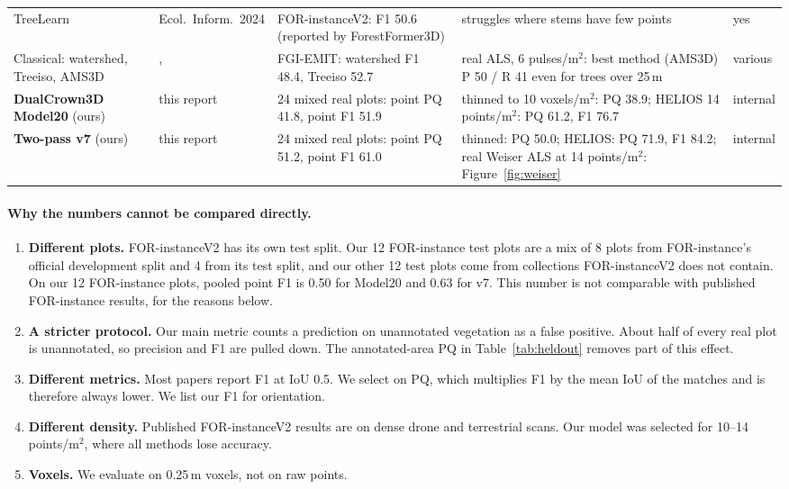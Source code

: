 \documentclass[11pt,a4paper]{article}
\newcommand{\ppsm}{points/m$^2$}
\newcommand{\vpsm}{voxels/m$^2$}
\begin{document}
\begin{table}[p]
\begin{tabularx}{\textwidth}{>{\raggedright\arraybackslash}p{2.9cm}>{\raggedright\arraybackslash}p{1.9cm}LL>{\raggedright\arraybackslash}p{1.8cm}}
TreeLearn \citep{henrich2024treelearn} & Ecol.\ Inform.\ 2024 & FOR-instanceV2: F1 50.6 (reported by ForestFormer3D) & struggles where stems have few points & yes \\
Classical: watershed, Treeiso, AMS3D & \citet{ruoppa2025fgiemit}, \citet{cao2023} & FGI-EMIT: watershed F1 48.4, Treeiso 52.7 & real ALS, 6 pulses/m$^2$: best method (AMS3D) P 50 / R 41 even for trees over 25\,m & various \\
\midrule
\textbf{DualCrown3D Model20} (ours) & this report & 24 mixed real plots: point PQ 41.8, point F1 51.9 & thinned to 10 \vpsm: PQ 38.9; HELIOS 14 \ppsm: PQ 61.2, F1 76.7 & internal \\
\textbf{Two-pass v7} (ours) & this report & 24 mixed real plots: point PQ 51.2, point F1 61.0 & thinned: PQ 50.0; HELIOS: PQ 71.9, F1 84.2; real Weiser ALS at 14 \ppsm: Figure~\ref{fig:weiser} & internal \\
\bottomrule
\end{tabularx}
\end{table}

\paragraph{Why the numbers cannot be compared directly.}
\begin{enumerate}
  \item \textbf{Different plots.} FOR-instanceV2 has its own test split. Our 12 FOR-instance test plots are a mix of 8 plots from FOR-instance's official development split and 4 from its test split, and our other 12 test plots come from collections FOR-instanceV2 does not contain. On our 12 FOR-instance plots, pooled point F1 is 0.50 for Model20 and 0.63 for v7. This number is not comparable with published FOR-instance results, for the reasons below.
  \item \textbf{A stricter protocol.} Our main metric counts a prediction on unannotated vegetation as a false positive. About half of every real plot is unannotated, so precision and F1 are pulled down. The annotated-area PQ in Table~\ref{tab:heldout} removes part of this effect.
  \item \textbf{Different metrics.} Most papers report F1 at IoU 0.5. We select on PQ, which multiplies F1 by the mean IoU of the matches and is therefore always lower. We list our F1 for orientation.
  \item \textbf{Different density.} Published FOR-instanceV2 results are on dense drone and terrestrial scans. Our model was selected for 10--14 \ppsm, where all methods lose accuracy.
  \item \textbf{Voxels.} We evaluate on 0.25\,m voxels, not on raw points.
\end{enumerate}
\end{document}
